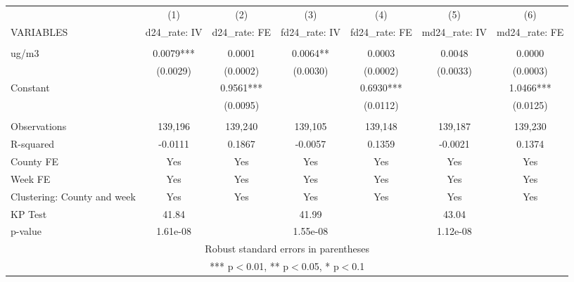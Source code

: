 \begin{tabular}{lcccccc} \hline
 & (1) & (2) & (3) & (4) & (5) & (6) \\
VARIABLES & d24\_rate: IV & d24\_rate: FE & fd24\_rate: IV & fd24\_rate: FE & md24\_rate: IV & md24\_rate: FE \\ \hline
 &  &  &  &  &  &  \\
ug/m3 & 0.0079*** & 0.0001 & 0.0064** & 0.0003 & 0.0048 & 0.0000 \\
 & (0.0029) & (0.0002) & (0.0030) & (0.0002) & (0.0033) & (0.0003) \\
Constant &  & 0.9561*** &  & 0.6930*** &  & 1.0466*** \\
 &  & (0.0095) &  & (0.0112) &  & (0.0125) \\
 &  &  &  &  &  &  \\
Observations & 139,196 & 139,240 & 139,105 & 139,148 & 139,187 & 139,230 \\
R-squared & -0.0111 & 0.1867 & -0.0057 & 0.1359 & -0.0021 & 0.1374 \\
County FE & Yes & Yes & Yes & Yes & Yes & Yes \\
Week FE & Yes & Yes & Yes & Yes & Yes & Yes \\
Clustering: County and week & Yes & Yes & Yes & Yes & Yes & Yes \\
KP Test & 41.84 &  & 41.99 &  & 43.04 &  \\
 p-value & 1.61e-08 &  & 1.55e-08 &  & 1.12e-08 &  \\ \hline
\multicolumn{7}{c}{ Robust standard errors in parentheses} \\
\multicolumn{7}{c}{ *** p$<$0.01, ** p$<$0.05, * p$<$0.1} \\
\end{tabular}
